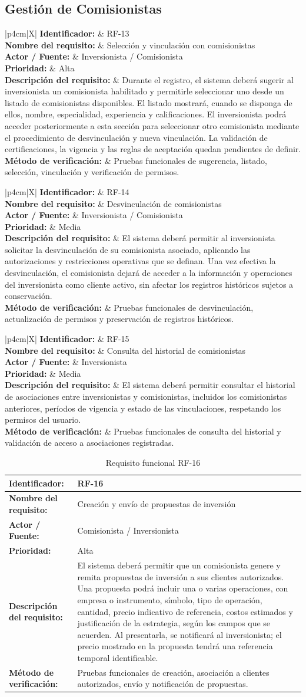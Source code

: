 \documentclass[11pt,a4paper,oneside]{article}
\newcommand{\tablaRequisito}[6]{%
\begin{table}[H]
\centering
\begin{tabularx}{\linewidth}{|p{4cm}|X|}
\hline
\textbf{Identificador:} & #1 \\ \hline
\textbf{Nombre del requisito:} & #2 \\ \hline
\textbf{Actor / Fuente:} & #3 \\ \hline
\textbf{Prioridad:} & #4 \\ \hline
\textbf{Descripción del requisito:} &
#5 \\ \hline
\textbf{Método de verificación:} & #6 \\ \hline
\end{tabularx}
\caption{Requisito funcional #1}
\label{tab:#1}
\end{table}
}
\begin{document}
\subsection{Gestión de Comisionistas}

\tablaRequisito
{RF-13}
{Selección y vinculación con comisionistas}
{Inversionista / Comisionista}
{Alta}
{Durante el registro, el sistema deberá sugerir al inversionista un comisionista habilitado y permitirle seleccionar uno desde un listado de comisionistas disponibles. El listado mostrará, cuando se disponga de ellos, nombre, especialidad, experiencia y calificaciones. El inversionista podrá acceder posteriormente a esta sección para seleccionar otro comisionista mediante el procedimiento de desvinculación y nueva vinculación. La validación de certificaciones, la vigencia y las reglas de aceptación quedan pendientes de definir.}
{Pruebas funcionales de sugerencia, listado, selección, vinculación y verificación de permisos.}


\tablaRequisito
{RF-14}
{Desvinculación de comisionistas}
{Inversionista / Comisionista}
{Media}
{El sistema deberá permitir al inversionista solicitar la desvinculación de su comisionista asociado, aplicando las autorizaciones y restricciones operativas que se definan. Una vez efectiva la desvinculación, el comisionista dejará de acceder a la información y operaciones del inversionista como cliente activo, sin afectar los registros históricos sujetos a conservación.}
{Pruebas funcionales de desvinculación, actualización de permisos y preservación de registros históricos.}


\tablaRequisito
{RF-15}
{Consulta del historial de comisionistas}
{Inversionista}
{Media}
{El sistema deberá permitir consultar el historial de asociaciones entre inversionistas y comisionistas, incluidos los comisionistas anteriores, períodos de vigencia y estado de las vinculaciones, respetando los permisos del usuario.}
{Pruebas funcionales de consulta del historial y validación de acceso a asociaciones registradas.}


\tablaRequisito
{RF-16}
{Creación y envío de propuestas de inversión}
{Comisionista / Inversionista}
{Alta}
{El sistema deberá permitir que un comisionista genere y remita propuestas de inversión a sus clientes autorizados. Una propuesta podrá incluir una o varias operaciones, con empresa o instrumento, símbolo, tipo de operación, cantidad, precio indicativo de referencia, costos estimados y justificación de la estrategia, según los campos que se acuerden. Al presentarla, se notificará al inversionista; el precio mostrado en la propuesta tendrá una referencia temporal identificable.}
{Pruebas funcionales de creación, asociación a clientes autorizados, envío y notificación de propuestas.}
\end{document}
